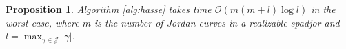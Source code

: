 \documentclass[a4paper]{article}
\newtheorem{prop}{Proposition}
\newcommand{\cJ}{\mathcal{J}}
\newcommand{\bigO}[1]{\mathcal{O}(#1)}
\begin{document}
\begin{prop}
  Algorithm \ref{alg:hasse} takes time $\bigO{m(m+l)\log l}$ in the worst case, 
  where $m$ is the number of Jordan curves in a realizable spadjor
  and $l = \max_{\gamma \in \cJ} \vert \gamma \vert$.
\end{prop}




\end{document}
